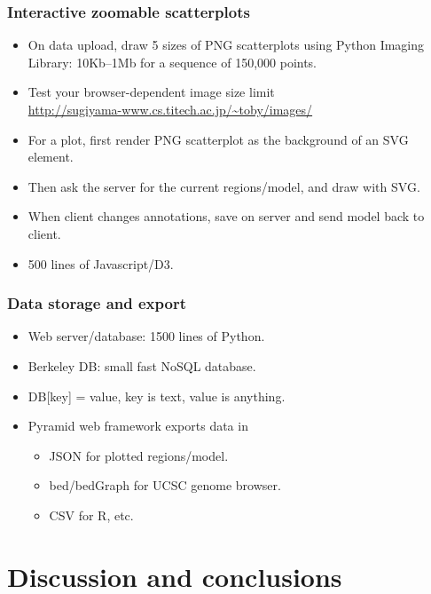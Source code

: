 \documentclass{beamer}
\begin{document}
  \begin{frame}
    \frametitle{Interactive zoomable scatterplots}
    \begin{itemize}
    \item On data upload, draw 5 sizes of PNG scatterplots using
      Python Imaging Library: 10Kb--1Mb for a sequence of 150,000
      points.
    \item Test your browser-dependent image size limit\\
      \url{http://sugiyama-www.cs.titech.ac.jp/~toby/images/}
    \item For a plot, first render PNG scatterplot as the background
      of an SVG element.
    \item Then ask the server for the current regions/model, and draw
      with SVG.
    \item When client changes annotations, save on server and send
      model back to client.
    \item 500 lines of Javascript/D3.
    \end{itemize}
  \end{frame}

  \begin{frame}
    \frametitle{Data storage and export}
    \begin{itemize}
    \item Web server/database: 1500 lines of Python.
    \item Berkeley DB: small fast NoSQL database.
    \item DB[key] = value, key is text, value is anything.
    \item Pyramid web framework exports data in
      \begin{itemize}
      \item JSON for plotted regions/model.
      \item bed/bedGraph for UCSC genome browser.
      \item CSV for R, etc.
      \end{itemize}
    \end{itemize}
  \end{frame}

\section{Discussion and conclusions}
\end{document}

